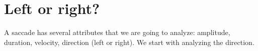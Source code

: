 \chapter{Left or right?}

A saccade has several attributes that we are going to analyze: amplitude, duration, velocity, direction (left or right). We start with analyzing the direction.